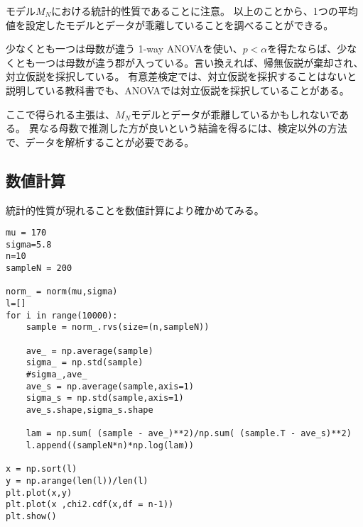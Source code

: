 モデル$M_N$における統計的性質であることに注意。
以上のことから、1つの平均値を設定したモデルとデータが乖離していることを調べることができる。


\begin{SMbox}{少なくとも一つは母数が違う}
    1-way ANOVAを使い、$p<\alpha$を得たならば、少なくとも一つは母数が違う郡が入っている。言い換えれば、帰無仮説が棄却され、対立仮説を採択している。    
    有意差検定では、対立仮説を採択することはないと説明している教科書でも、ANOVAでは対立仮説を採択していることがある。
    
    ここで得られる主張は、$M_N$モデルとデータが乖離しているかもしれないである。
    異なる母数で推測した方が良いという結論を得るには、検定以外の方法で、データを解析することが必要である。
\end{SMbox}

\subsection{数値計算}
統計的性質が現れることを数値計算により確かめてみる。
\begin{lstlisting}
mu = 170
sigma=5.8
n=10
sampleN = 200

norm_ = norm(mu,sigma)
l=[]
for i in range(10000):
    sample = norm_.rvs(size=(n,sampleN))

    ave_ = np.average(sample)
    sigma_ = np.std(sample) 
    #sigma_,ave_
    ave_s = np.average(sample,axis=1)
    sigma_s = np.std(sample,axis=1)
    ave_s.shape,sigma_s.shape

    lam = np.sum( (sample - ave_)**2)/np.sum( (sample.T - ave_s)**2)
    l.append((sampleN*n)*np.log(lam))

x = np.sort(l)
y = np.arange(len(l))/len(l)
plt.plot(x,y)
plt.plot(x ,chi2.cdf(x,df = n-1))
plt.show()
\end{lstlisting}